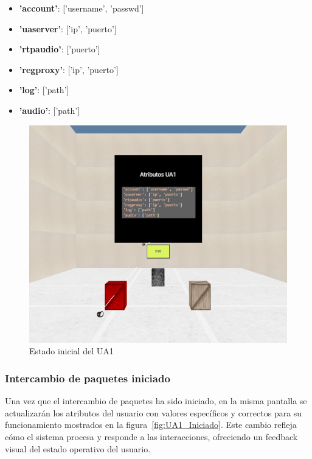\documentclass[a4paper, 12pt]{book}
\begin{document}
\begin{itemize}
  \item \textbf{'account'}: ['username', 'passwd']
  \item \textbf{'uaserver'}: ['ip', 'puerto']
  \item \textbf{'rtpaudio'}: ['puerto']
  \item \textbf{'regproxy'}: ['ip', 'puerto']
  \item \textbf{'log'}: ['path']
  \item \textbf{'audio'}: ['path']
\end{itemize}

\begin{figure}
  \centering
  \includegraphics[width=15cm, keepaspectratio]{img/resultados/UA1_NoIniciado.png}
  \caption{Estado inicial del UA1}
  \label{fig:UA1_NoIniciado}
\end{figure}


\subsubsection{Intercambio de paquetes iniciado}
\label{subsubsec:Intercambio_Iniciado}
Una vez que el intercambio de paquetes ha sido iniciado, en la misma pantalla se 
actualizarán los atributos del usuario con valores específicos y correctos para su funcionamiento mostrados en la figura~\ref{fig:UA1_Iniciado}.  
Este cambio refleja cómo el sistema procesa y responde a las interacciones, ofreciendo un feedback visual del estado operativo del usuario.
\end{document}

